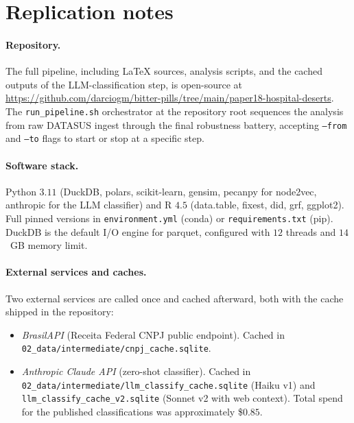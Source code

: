 

\section{Replication notes}
\label{app:replication}

\paragraph{Repository.} The full pipeline, including LaTeX sources,
analysis scripts, and the cached outputs of the LLM-classification step,
is open-source at \url{https://github.com/darciogm/bitter-pills/tree/main/paper18-hospital-deserts}.
The \texttt{run\_pipeline.sh} orchestrator at the repository root
sequences the analysis from raw DATASUS ingest through the final
robustness battery, accepting \texttt{--from} and \texttt{--to} flags
to start or stop at a specific step.

\paragraph{Software stack.} Python $3.11$ (DuckDB, polars, scikit-learn,
gensim, pecanpy for node2vec, anthropic for the LLM classifier) and
R $4.5$ (data.table, fixest, did, grf, ggplot2). Full pinned versions
in \texttt{environment.yml} (conda) or \texttt{requirements.txt} (pip).
DuckDB is the default I/O engine for parquet, configured with $12$
threads and $14$~GB memory limit.

\paragraph{External services and caches.} Two external services are
called once and cached afterward, both with the cache shipped in the
repository:

\begin{itemize}
    \item \emph{BrasilAPI} (Receita Federal CNPJ public endpoint).
    Cached in \texttt{02\_data/intermediate/cnpj\_cache.sqlite}.
    \item \emph{Anthropic Claude API} (zero-shot classifier). Cached in
    \texttt{02\_data/intermediate/llm\_classify\_cache.sqlite} (Haiku
    v1) and \texttt{llm\_classify\_cache\_v2.sqlite} (Sonnet v2 with
    web context). Total spend for the published classifications was
    approximately \$$0.85$.
\end{itemize}

